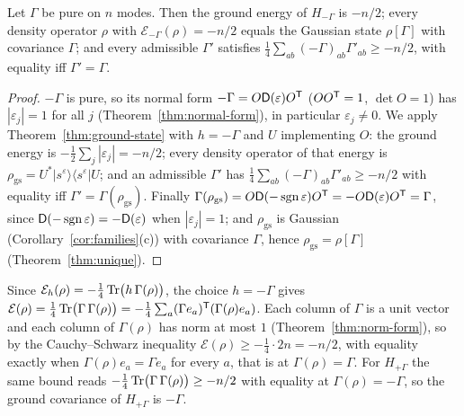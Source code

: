 \begin{theorem}\label{thm:pure-ground}
Let $\Gamma$ be pure on $n$ modes. Then the ground energy of $H_{-\Gamma}$ is $-n/2$; every
density operator $\rho$ with $\mathcal E_{-\Gamma}(\rho)=-n/2$ equals the Gaussian state $\rho[\Gamma]$
with covariance $\Gamma$; and every admissible $\Gamma'$ satisfies
$\tfrac14\sum_{ab}(-\Gamma)_{ab}\Gamma'_{ab}\geq-n/2$, with equality iff $\Gamma'=\Gamma$.
\end{theorem}
\begin{proof}
$-\Gamma$ is pure, so its normal form $-\Gamma=O\mathsf D(\varepsilon)O^{\mathsf T}$ ($OO^{\mathsf T}=1$, $\det O=1$)
has $|\varepsilon_j|=1$ for all $j$ (Theorem~\ref{thm:normal-form}), in particular
$\varepsilon_j\neq0$. We apply Theorem~\ref{thm:ground-state} with $h=-\Gamma$ and $U$ implementing $O$:
the ground energy is $-\tfrac12\sum_j|\varepsilon_j|=-n/2$; every density operator of that
energy is $\rho_{\mathrm{gs}}=U^*|s^\varepsilon\rangle\langle s^\varepsilon|U$; and an admissible $\Gamma'$
has $\tfrac14\sum_{ab}(-\Gamma)_{ab}\Gamma'_{ab}\geq-n/2$ with equality iff $\Gamma'=\Gamma(\rho_{\mathrm{gs}})$.
Finally $\Gamma(\rho_{\mathrm{gs}})=O\mathsf D(-\operatorname{sgn}\varepsilon)O^{\mathsf T}=-O\mathsf D(\varepsilon)O^{\mathsf T}=\Gamma$, since
$\mathsf D(-\operatorname{sgn}\varepsilon)=-\mathsf D(\varepsilon)$ when $|\varepsilon_j|=1$; and $\rho_{\mathrm{gs}}$ is Gaussian
(Corollary~\ref{cor:families}(c)) with covariance $\Gamma$, hence $\rho_{\mathrm{gs}}=\rho[\Gamma]$
(Theorem~\ref{thm:unique}).
\end{proof}
\begin{remark}\label{rem:sign}
Since $\mathcal E_h(\rho)=-\tfrac14\operatorname{Tr}\bigl(h\,\Gamma(\rho)\bigr)$, the choice $h=-\Gamma$ gives
$\mathcal E(\rho)=\tfrac14\operatorname{Tr}\bigl(\Gamma\,\Gamma(\rho)\bigr)=-\tfrac14\sum_a(\Gamma e_a)^{\mathsf T}(\Gamma(\rho)e_a)$.
Each column of $\Gamma$ is a unit vector and each column of $\Gamma(\rho)$ has norm at most $1$
(Theorem~\ref{thm:norm-form}), so by the Cauchy--Schwarz inequality $\mathcal E(\rho)\geq-\tfrac14\cdot2n=-n/2$,
with equality exactly when $\Gamma(\rho)e_a=\Gamma e_a$ for every $a$, that is at $\Gamma(\rho)=\Gamma$. For $H_{+\Gamma}$ the same bound reads
$-\tfrac14\operatorname{Tr}\bigl(\Gamma\,\Gamma(\rho)\bigr)\geq-n/2$ with equality at $\Gamma(\rho)=-\Gamma$, so
the ground covariance of $H_{+\Gamma}$ is $-\Gamma$.
\end{remark}

